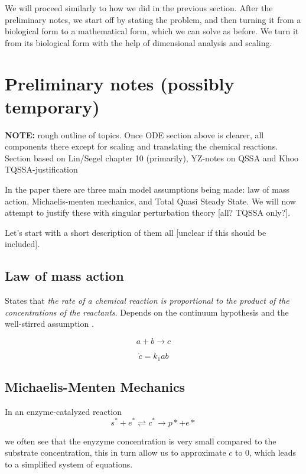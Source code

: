 \documentclass[12pt]{report}
\begin{document}
We will proceed similarly to how we did in the previous section. After the preliminary notes, we start off by stating the problem, and then turning it from a biological form to a mathematical form, which we can solve as before. We turn it from its biological form with the help of dimensional analysis and scaling.

\section{Preliminary notes (possibly temporary)}

\textbf{NOTE:} rough outline of topics. Once ODE section above is
clearer, all components there except for scaling and translating the
chemical reactions.  Section based on Lin/Segel chapter 10
(primarily), YZ-notes on QSSA and Khoo TQSSA-justification

In the paper there are three main model assumptions being made: law of
mass action, Michaelis-menten mechanics, and Total Quasi Steady
State. We will now attempt to justify these with singular perturbation
theory [all? TQSSA only?].

Let's start with a short description of them all [unclear if this should be included].

\subsection{Law of mass action}

States that \textit{the rate of a chemical reaction is proportional to the
product of the concentrations of the reactants}. Depends on the continuum
hypothesis and the well-stirred assumption \cite{Ingalls}.

\begin{equation}
a+b \rightarrow c
\end{equation}

\begin{equation}
\dot{c} = k_1 ab
\end{equation}

\subsection{Michaelis-Menten Mechanics}

In an enzyme-catalyzed reaction $$ s^* + e^* \rightleftharpoons
c^* \rightarrow p*+e* $$

we often see that the enyzyme concentration is very small compared to
the substrate concentration, this in turn allow us to approximate $\dot{c}$ to
0, which leads to a simplified system of equations.
\end{document}
